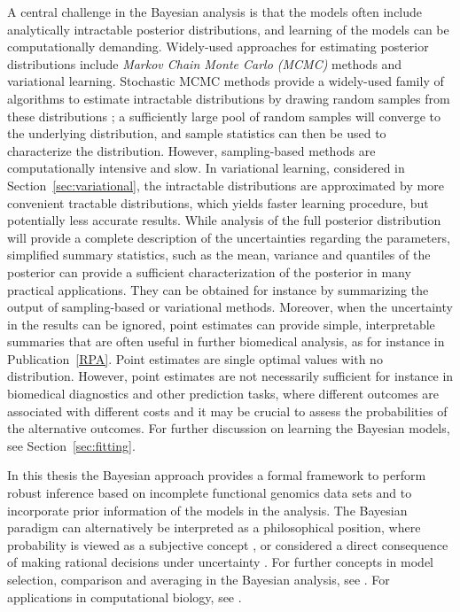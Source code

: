A central challenge in the Bayesian analysis is that the models often
include analytically intractable posterior distributions, and learning
of the models can be computationally demanding. Widely-used approaches
for estimating posterior distributions include {\it Markov Chain Monte
Carlo (MCMC)} methods and variational learning. Stochastic MCMC
methods provide a widely-used family of algorithms to estimate
intractable distributions by drawing random samples from these
distributions \citep[see e.g.][]{Gelman03}; a sufficiently large pool
of random samples will converge to the underlying distribution, and
sample statistics can then be used to characterize the distribution.
However, sampling-based methods are computationally intensive and
slow. In variational learning, considered in
Section~\ref{sec:variational}, the intractable distributions are
approximated by more convenient tractable distributions, which yields
faster learning procedure, but potentially less accurate results.
While analysis of the full posterior distribution will provide a
complete description of the uncertainties regarding the parameters,
simplified summary statistics, such as the mean, variance and
quantiles of the posterior can provide a sufficient characterization
of the posterior in many practical applications. They can be obtained
for instance by summarizing the output of sampling-based or
variational methods. Moreover, when the uncertainty in the results can
be ignored, point estimates can provide simple, interpretable
summaries that are often useful in further biomedical analysis, as for
instance in Publication~\ref{RPA}. Point estimates are single optimal
values with no distribution.  However, point estimates are not
necessarily sufficient for instance in biomedical diagnostics and
other prediction tasks, where different outcomes are associated with
different costs and it may be crucial to assess the probabilities of
the alternative outcomes. For further discussion on learning the
Bayesian models, see Section~\ref{sec:fitting}.

In this thesis the Bayesian approach provides a formal framework to
perform robust inference based on incomplete functional genomics data
sets and to incorporate prior information of the models in the
analysis. The Bayesian paradigm can alternatively be interpreted as a
philosophical position, where probability is viewed as a subjective
concept \citep{Cox46}, or considered a direct consequence of making
rational decisions under uncertainty \citep{Bernardo00}. For further
concepts in model selection, comparison and averaging in the Bayesian
analysis, see \cite{Gelman03}. For applications in computational
biology, see \cite{Wilkinson2007}.


